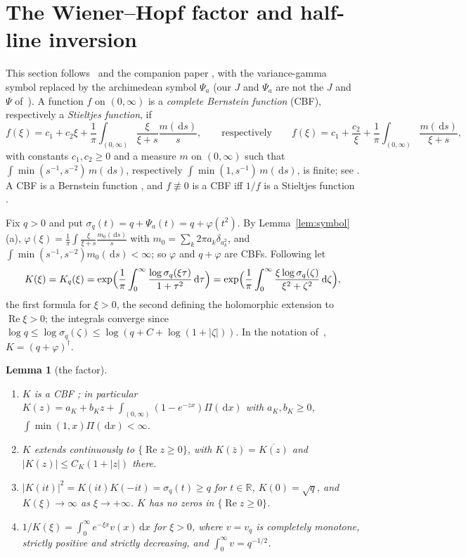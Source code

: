 \documentclass[11pt]{amsart}
\newcommand{\R}{\mathbb{R}}
\newcommand{\dd}{\,\mathrm{d}}
\DeclareMathOperator{\re}{Re}
\newtheorem{lemma}[theorem]{Lemma}
\theoremstyle{definition}
\theoremstyle{remark}
\numberwithin{equation}{section}
\begin{document}
\section{The Wiener--Hopf factor and half-line inversion}\label{sec:WH}

This section follows~\cite[Sect.~2--3]{Kw11} and the companion paper \cite[\S\S3--4]{BPL}, with the variance-gamma symbol replaced by the archimedean symbol $\Psi_a$ (our $J$ and $\Psi_a$ are not the $J$ and $\Psi$ of~\cite{BPL}). A function $f$ on $(0,\infty)$ is a \emph{complete Bernstein function} (CBF), respectively a \emph{Stieltjes function}, if
\[
f(\xi)=c_1+c_2\xi+\frac1\pi\int_{(0,\infty)}\frac{\xi}{\xi+s}\frac{m(\dd s)}s,\qquad\text{respectively}\qquad f(\xi)=c_1+\frac{c_2}\xi+\frac1\pi\int_{(0,\infty)}\frac{m(\dd s)}{\xi+s},
\]
with constants $c_1,c_2\ge0$ and a measure $m$ on $(0,\infty)$ such that $\int\min(s^{-1},s^{-2})\,m(\dd s)$, respectively $\int\min(1,s^{-1})\,m(\dd s)$, is finite; see \cite[Cor.~2.16(b)]{Kw11}. A CBF is a Bernstein function \cite[(2.20)]{Kw11}, and $f\not\equiv0$ is a CBF iff $1/f$ is a Stieltjes function \cite[Prop.~2.17(a)]{Kw11}.

Fix $q>0$ and put $\sigma_q(t)=q+\Psi_a(t)=q+\varphi(t^2)$. By Lemma~\ref{lem:symbol}(a), $\varphi(\xi)=\frac1\pi\int\frac\xi{\xi+s}\frac{m_0(\dd s)}s$ with $m_0=\sum_k2\pi a_k\delta_{a_k^2}$, and $\int\min(s^{-1},s^{-2})m_0(\dd s)<\infty$; so $\varphi$ and $q+\varphi$ are CBFs. Following \cite[Def.~3.1, Prop.~3.2]{Kw11} let
\begin{equation}\label{eq:K}
K(\xi)=K_q(\xi)=\exp\Bigl(\frac1\pi\int_0^\infty\frac{\log\sigma_q(\xi\tau)}{1+\tau^2}\dd\tau\Bigr)=\exp\Bigl(\frac1\pi\int_0^\infty\frac{\xi\log\sigma_q(\zeta)}{\xi^2+\zeta^2}\dd\zeta\Bigr),
\end{equation}
the first formula for $\xi>0$, the second defining the holomorphic extension to $\re\xi>0$; the integrals converge since $\log q\le\log\sigma_q(\zeta)\le\log(q+C+\log(1+|\zeta|))$. In the notation of~\cite{Kw11}, $K=(q+\varphi)^\dagger$.

\begin{lemma}[the factor]\label{lem:K}
\begin{enumerate}
\item[(K1)] $K$ is a CBF \cite[Lemma~3.8]{Kw11}; in particular $K(z)=a_K+b_Kz+\int_{(0,\infty)}(1-e^{-zx})\Pi(\dd x)$ with $a_K,b_K\ge0$, $\int\min(1,x)\Pi(\dd x)<\infty$.
\item[(K2)] $K$ extends continuously to $\{\re z\ge0\}$, with $K(\bar z)=\overline{K(z)}$ and $|K(z)|\le C_K(1+|z|)$ there.
\item[(K3)] $|K(it)|^2=K(it)K(-it)=\sigma_q(t)\ge q$ for $t\in\R$, $K(0)=\sqrt q$, and $K(\xi)\to\infty$ as $\xi\to+\infty$. $K$ has no zeros in $\{\re z\ge0\}$.
\item[(K4)] $1/K(\xi)=\int_0^\infty e^{-\xi x}v(x)\dd x$ for $\xi>0$, where $v=v_q$ is completely monotone, strictly positive and strictly decreasing, and $\int_0^\infty v=q^{-1/2}$.
\end{enumerate}
\end{lemma}
\end{document}
